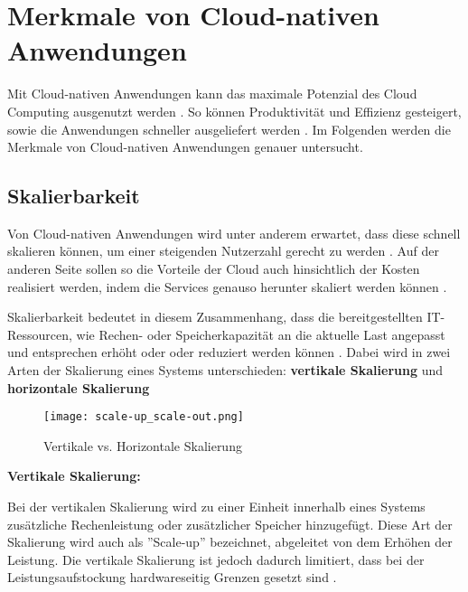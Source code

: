 \section{Merkmale von Cloud-nativen Anwendungen}
\label{sec:cloud-native-anwendungen}
Mit Cloud-nativen Anwendungen kann das maximale Potenzial des Cloud Computing ausgenutzt werden \cite[Vgl.][]{VMwareb}. So können Produktivität und Effizienz gesteigert, sowie die Anwendungen schneller ausgeliefert werden \cite[Vgl][S. 12]{Chandrasekaran2022}. Im Folgenden werden die Merkmale von Cloud-nativen Anwendungen genauer untersucht.

\subsection{Skalierbarkeit}
Von Cloud-nativen Anwendungen wird unter anderem erwartet, dass diese schnell skalieren können, um einer steigenden Nutzerzahl gerecht zu werden \cite[Vgl.][S. 1ff]{Armbrust2009}\cite[Vgl.][S. 234]{Villamizar2017}. Auf der anderen Seite sollen so die Vorteile der Cloud auch hinsichtlich der Kosten realisiert werden, indem die Services genauso herunter skaliert werden können \cite[Vgl.][S. 884]{Adzic2017}.

Skalierbarkeit bedeutet in diesem Zusammenhang, dass die bereitgestellten IT-Ressourcen, wie Rechen- oder Speicherkapazität an die aktuelle Last angepasst und entsprechen erhöht oder oder reduziert werden können \cite[Vgl.][S. 15]{Reinheimer2018}\cite[Vgl.][]{Geißler2019}. Dabei wird in zwei Arten der Skalierung eines Systems unterschieden: \textbf{vertikale Skalierung} und \textbf{horizontale Skalierung} \cite[Vgl.][]{Geißler2019}\cite[Vgl.][]{VMware}

\begin{figure}[H]
    \centering
    \texttt{[image: scale-up\_scale-out.png]}
    \caption{Vertikale vs. Horizontale Skalierung \cite[Nachbildung nach][]{Bachmann2019}}
    \label{fig:scale-up-scale-out}
\end{figure}
\pagebreak

\textbf{Vertikale Skalierung:}

Bei der vertikalen Skalierung wird zu einer Einheit innerhalb eines Systems zusätzliche Rechenleistung oder zusätzlicher Speicher hinzugefügt. Diese Art der Skalierung wird auch als ''Scale-up'' bezeichnet, abgeleitet von dem Erhöhen der Leistung. Die vertikale Skalierung ist jedoch dadurch limitiert, dass bei der Leistungsaufstockung hardwareseitig Grenzen gesetzt sind \cite[Vgl.][]{Geißler2019}\cite[Vgl.][]{VMware}.

